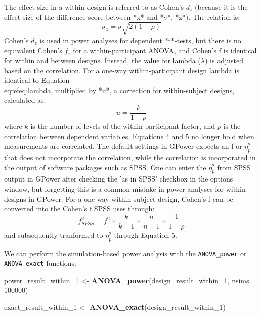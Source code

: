 \documentclass[
  ,man,floatsintext]{apa6}
\newenvironment{Shaded}{\begin{snugshade}}{\end{snugshade}}
\newcommand{\DataTypeTok}[1]{\textcolor[rgb]{0.13,0.29,0.53}{#1}}
\newcommand{\DecValTok}[1]{\textcolor[rgb]{0.00,0.00,0.81}{#1}}
\newcommand{\KeywordTok}[1]{\textcolor[rgb]{0.13,0.29,0.53}{\textbf{#1}}}
\newcommand{\NormalTok}[1]{#1}
\newcommand{\StringTok}[1]{\textcolor[rgb]{0.31,0.60,0.02}{#1}}
\begin{document}
\begin{tcolorbox}[colback=black!5!white,colframe=white!5!black,title=Box 1. Formula for effect sizes for within designs]
The effect size in a within-design is referred to as Cohen's $d_z$ (because it is the effect size of the difference score between *x* and *y*, *z*). The relation is:
\begin{equation}
\sigma_{z}=\sigma\sqrt{2(1-\rho)}
\end{equation}
Cohen's $d_z$ is used in power analyses for dependent *t*-tests, but there is no equivalent Cohen's $f_z$ for a within-participant ANOVA, and Cohen's f is identical for within and between designs. 
Instead, the value for lambda ($\lambda$) is adjusted based on the correlation. 
For a one-way within-participant design lambda is identical to Equation \\eqref{eq:lambda}, multiplied by *u*, a correction for within-subject designs, calculated as:
\begin{equation}
u = \frac{k}{1-\rho}
\end{equation}
where $k$ is the number of levels of the within-participant factor, and $\rho$ is the correlation between dependent variables.
Equations 4 and 5 no longer hold when measurements are correlated.
The default settings in G\*Power expects an f or $\eta_p^2$ that does not incorporate the correlation, while the correlation is incorporated in the output of software packages such as SPSS. 
One can  enter the $\eta_p^2$ from SPSS output in G\*Power after checking the 'as in SPSS' checkbox in the options window, but forgetting this is a common mistake in power analyses for within designs in G\*Power.
For a one-way within-subject design, Cohen's f can be converted into the Cohen's f SPSS uses through:
\begin{equation}
f^2_{SPSS} = f^2 \times \frac{k}{k-1} \times \frac{n}{n-1} \times \frac{1}{1-\rho}
\end{equation}
and subsequently tranformed to $\eta_p^2$ through Equation 5.
\end{tcolorbox}

We can perform the simulation-based power analysis with the \texttt{ANOVA\_power} or \texttt{ANOVA\_exact} functions.

\begin{Shaded}
\begin{Highlighting}[]
\NormalTok{power_result_within_}\DecValTok{1}\NormalTok{ <-}\StringTok{ }\KeywordTok{ANOVA_power}\NormalTok{(design_result_within_}\DecValTok{1}\NormalTok{, }
                                     \DataTypeTok{nsims =} \DecValTok{100000}\NormalTok{)}

\NormalTok{exact_result_within_}\DecValTok{1}\NormalTok{ <-}\StringTok{ }\KeywordTok{ANOVA_exact}\NormalTok{(design_result_within_}\DecValTok{1}\NormalTok{)}
\end{Highlighting}
\end{Shaded}
\end{document}
